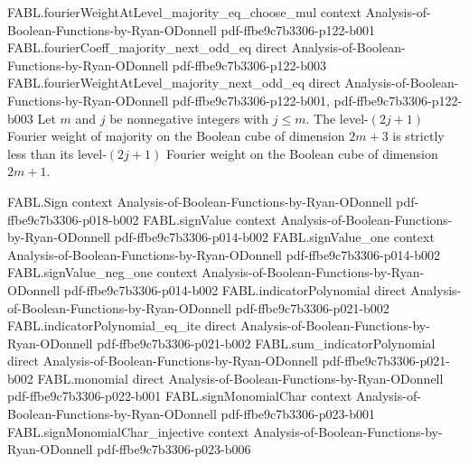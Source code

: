 \begin{theorem}
\proofstep
  {FABL.fourierWeightAtLevel_majority_eq_choose_mul}
  {context}
  {Analysis-of-Boolean-Functions-by-Ryan-ODonnell}
  {pdf-ffbe9c7b3306-p122-b001}
\proofstep
  {FABL.fourierCoeff_majority_next_odd_eq}
  {direct}
  {Analysis-of-Boolean-Functions-by-Ryan-ODonnell}
  {pdf-ffbe9c7b3306-p122-b003}
\proofstep
  {FABL.fourierWeightAtLevel_majority_next_odd_eq}
  {direct}
  {Analysis-of-Boolean-Functions-by-Ryan-ODonnell}
  {pdf-ffbe9c7b3306-p122-b001,
    pdf-ffbe9c7b3306-p122-b003}
Let $m$ and $j$ be nonnegative integers with $j\le m$. The level-$(2j+1)$ Fourier weight
of majority on the Boolean cube of dimension $2m+3$ is strictly less than its
level-$(2j+1)$ Fourier weight on the Boolean cube of dimension $2m+1$.
\end{theorem}

\begin{theorem}
\label{FABL.fourierWeightAtLevel_majority_odd_sequence_strictAnti}
\leanok
{}
\proofstep
  {FABL.Sign}
  {context}
  {Analysis-of-Boolean-Functions-by-Ryan-ODonnell}
  {pdf-ffbe9c7b3306-p018-b002}
\proofstep
  {FABL.signValue}
  {context}
  {Analysis-of-Boolean-Functions-by-Ryan-ODonnell}
  {pdf-ffbe9c7b3306-p014-b002}
\proofstep
  {FABL.signValue_one}
  {context}
  {Analysis-of-Boolean-Functions-by-Ryan-ODonnell}
  {pdf-ffbe9c7b3306-p014-b002}
\proofstep
  {FABL.signValue_neg_one}
  {context}
  {Analysis-of-Boolean-Functions-by-Ryan-ODonnell}
  {pdf-ffbe9c7b3306-p014-b002}
\proofstep
  {FABL.indicatorPolynomial}
  {direct}
  {Analysis-of-Boolean-Functions-by-Ryan-ODonnell}
  {pdf-ffbe9c7b3306-p021-b002}
\proofstep
  {FABL.indicatorPolynomial_eq_ite}
  {direct}
  {Analysis-of-Boolean-Functions-by-Ryan-ODonnell}
  {pdf-ffbe9c7b3306-p021-b002}
\proofstep
  {FABL.sum_indicatorPolynomial}
  {direct}
  {Analysis-of-Boolean-Functions-by-Ryan-ODonnell}
  {pdf-ffbe9c7b3306-p021-b002}
\proofstep
  {FABL.monomial}
  {direct}
  {Analysis-of-Boolean-Functions-by-Ryan-ODonnell}
  {pdf-ffbe9c7b3306-p022-b001}
\proofstep
  {FABL.signMonomialChar}
  {context}
  {Analysis-of-Boolean-Functions-by-Ryan-ODonnell}
  {pdf-ffbe9c7b3306-p023-b001}
\proofstep
  {FABL.signMonomialChar_injective}
  {context}
  {Analysis-of-Boolean-Functions-by-Ryan-ODonnell}
  {pdf-ffbe9c7b3306-p023-b006}

\end{theorem}
